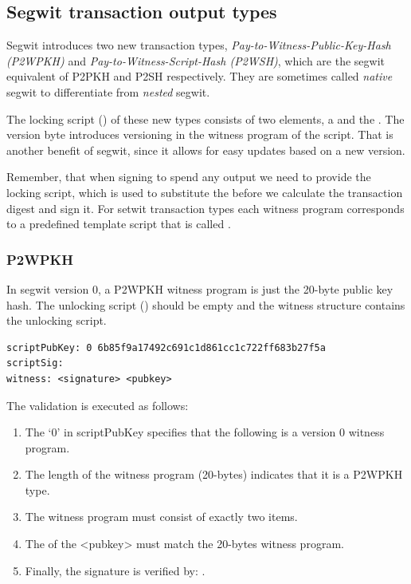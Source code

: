 \subsection*{Segwit transaction output types}
Segwit introduces two new transaction types, \emph{Pay-to-Witness-Public-Key-Hash (P2WPKH)} and \emph{Pay-to-Witness-Script-Hash (P2WSH)}, which are the segwit equivalent of P2PKH and P2SH respectively. They are sometimes called \emph{native} segwit to differentiate from \emph{nested} segwit.

The locking script () of these new types consists of two elements, a  and the . The version byte introduces versioning in the witness program of the script. That is another benefit of segwit, since it allows for easy updates based on a new version.

Remember, that when signing to spend any output we need to provide the locking script, which is used to substitute the  before we calculate the transaction digest and sign it. For setwit transaction types each witness program corresponds to a predefined template script that is called .

\subsubsection*{P2WPKH}
In segwit version 0, a P2WPKH witness program is just the 20-byte public key hash. The unlocking script () should be empty and the witness structure contains the unlocking script.

\begin{emphbox}
\begin{lstlisting}[style=Pseudomath]
scriptPubKey: 0 6b85f9a17492c691c1d861cc1c722ff683b27f5a
scriptSig:
witness: <signature> <pubkey>
\end{lstlisting}
\end{emphbox}

The validation is executed as follows:
\begin{enumerate}
\item The `0' in scriptPubKey specifies that the following is a version 0 witness program.
\item The length of the witness program (20-bytes) indicates that it is a P2WPKH type.
\item The witness program must consist of exactly two items.
\item The  of the <pubkey> must match the 20-bytes witness program.
\item Finally, the signature is verified by: .
\end{enumerate}

